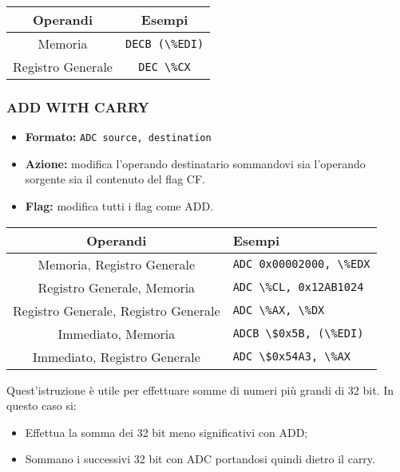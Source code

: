 \documentclass[a4paper,11pt]{article}
\begin{document}
		\begin{table}[h!]
			\center {}
			\begin{tabular} { c | c }
				\bfseries Operandi & \bfseries Esempi \\
				\hline 
				Memoria & \lstinline|DECB (\%EDI)| \\
				Registro Generale & \lstinline|DEC \%CX|
			\end{tabular}
		\end{table}

\subsubsection{ADD WITH CARRY}
\begin{itemize}
	\item \textbf{Formato:} \lstinline|ADC source, destination|
	\item \textbf{Azione:} modifica l'operando destinatario sommandovi sia l'operando sorgente sia il contenuto del flag CF.
	\item \textbf{Flag:} modifica tutti i flag come ADD. 
\end{itemize}

\begin{table}[h!]
			\center {}
			\begin{tabular} { c | p{5cm} }
				\bfseries Operandi & \bfseries Esempi \\
				\hline
				Memoria, Registro Generale & \lstinline|ADC 0x00002000, \%EDX| \\ 
				Registro Generale, Memoria & \lstinline|ADC \%CL, 0x12AB1024| \\ 
				Registro Generale, Registro Generale & \lstinline|ADC \%AX, \%DX| \\ 
				Immediato, Memoria & \lstinline|ADCB \$0x5B, (\%EDI)| \\ 
				Immediato, Registro Generale & \lstinline|ADC \$0x54A3, \%AX|
			\end{tabular}
		\end{table}

Quest'istruzione è utile per effettuare somme di numeri più grandi di 32 bit.
In questo caso si:
\begin{itemize}
	\item Effettua la somma dei 32 bit meno significativi con ADD;
	\item Sommano i successivi 32 bit con ADC portandosi quindi dietro il carry.
\end{itemize}
\end{document}
